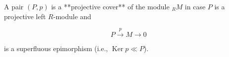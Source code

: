 A pair $(P, p)$ is a **projective cover** of the module ${}_R M$ in case $P$ is a projective left $R$-module and

$$P \xrightarrow{p} M \rightarrow 0$$

is a superfluous epimorphism (i.e., $\operatorname{Ker} p \ll P$).

